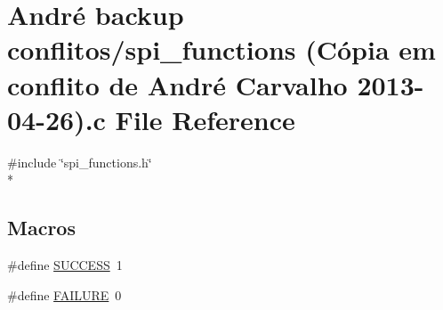 \hypertarget{spi__functions_01_07C_xC3_xB3pia_01em_01conflito_01de_01Andr_xC3_xA9_01Carvalho_012013-04-26_08_8c}{\section{André backup conflitos/spi\-\_\-functions (Cópia em conflito de André Carvalho 2013-\/04-\/26).c File Reference}
\label{spi__functions_01_07C_xC3_xB3pia_01em_01conflito_01de_01Andr_xC3_xA9_01Carvalho_012013-04-26_08_8c}
}
{\ttfamily \#include \char`\"{}spi\-\_\-functions.\-h\char`\"{}}\\*
\subsection*{Macros}
\begin{DoxyCompactItemize}
\item 
\#define \hyperlink{spi__functions_01_07C_xC3_xB3pia_01em_01conflito_01de_01Andr_xC3_xA9_01Carvalho_012013-04-26_08_8c_aa90cac659d18e8ef6294c7ae337f6b58}{S\-U\-C\-C\-E\-S\-S}~1
\item 
\#define \hyperlink{spi__functions_01_07C_xC3_xB3pia_01em_01conflito_01de_01Andr_xC3_xA9_01Carvalho_012013-04-26_08_8c_a6d58f9ac447476b4e084d7ca383f5183}{F\-A\-I\-L\-U\-R\-E}~0
\end{DoxyCompactItemize}
